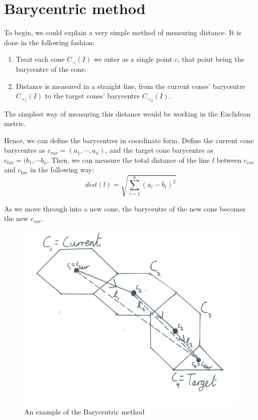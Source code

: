 \documentclass[12pt,a4paper]{report}
\begin{document}
\section{Barycentric method}
To begin, we could explain a very simple method of measuring distance. It is done in the following fashion:

\begin{enumerate}
    \item Treat each cone $C_{\prec} (I)$ we enter as a single point $c$, that point being the barycentre of the cone.
    \item Distance is measured in a straight line, from the current cones' barycentre $C_{\prec_{1}} (I)$  to the target cones' barycentre $C_{\prec_{2}} (I)$.
\end{enumerate}


The simplest way of measuring this distance would be working in the Euclidean metric.

Hence, we can define the barycentres in coordinate form. Define the current cone barycentre as $c_{cur} = (a_{1}, \cdots, a_{n})$, and the target cone barycentre as $c_{tar} = (b_{1}, \cdots b_{n}$. Then, we can measure the total distance of the line $l$ between $c_{cur}$ and $c_{tar}$ in the following way:
\begin{equation*}
    dist(l) = \sqrt{\sum_{i=1}^{n} (a_{i} - b_{i})^{2}}
\end{equation*}

As we move through into a new cone, the barycentre of the new cone becomes the new $c_{cur}$.

\begin{figure}
\includegraphics[scale=0.5]{Chapters/images/Barycentre1.png}
\caption{An example of the Barycentric method}
\end{figure}
\end{document}
